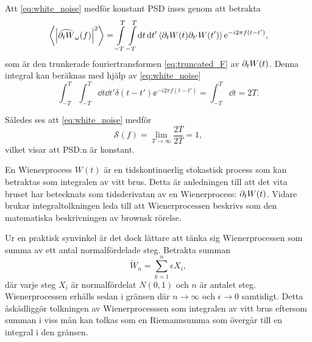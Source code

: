 Att \eqref{eq:white_noise} medför konstant PSD inses genom att betrakta
\begin{equation}
    \ev{\abs{\widehat{\pd_tW}_\omega(f)}^2} =
    \int_{-T}^{T}\int_{-T}^{T}\!\dd{t}\dd{t'}
    \ev{\pd_tW(t)\pd_{t'}W(t')}\ee^{-i2\pi f(t-t')},
\end{equation}
som är den trunkerade fouriertransformen \eqref{eq:truncated_F} av $\partial_tW(t)$. Denna integral kan beräknas med hjälp av \eqref{eq:white_noise}
\begin{equation}
    \int_{-T}^{T}\int_{-T}^{T}\!\dd{t}\dd{t'} 
     \delta(t-t')\ee^{-i2\pi f(t-t')} 
    =  \int_{-T}^{T}\dd{t} =2T.
\end{equation}

Således ses att \eqref{eq:white_noise} medför 
\begin{equation} \label{eq:white-noise_PSD}
    \mathcal{S}(f) = \lim_{T\to\infty}\dfrac{2T}{2T} = 1,
\end{equation}
vilket visar att PSD:n är konstant. 



En Wienerprocess $W(t)$ är en tidskontinuerlig stokastisk process som kan betraktas som integralen av vitt brus\cite{Miller_probability2012}. Detta är anledningen till att det vita bruset har betecknats som tidsderivatan av en Wienerprocess: $\partial_tW(t)$. Vidare brukar integraltolkningen leda till att Wienerprocessen beskrivs som den matematiska beskrivningen av brownsk rörelse. 

Ur en praktisk synvinkel är det dock lättare att tänka sig Wienerprocessen som summa av ett antal normalfördelade steg. Betrakta summan
\begin{equation}\label{eq:wiener_approx}
\tilde{W}_n = \sum_{k=1}^{n} \epsilon X_i,
\end{equation}
där varje steg $X_i$ är normalfördelat $N(0,1)$ och $n$ är antalet steg. 
Wienerprocessen erhålls sedan i gränsen där $n\to\infty$ och $\epsilon\to 0$ samtidigt\cite{Miller_probability2012}. Detta åskådliggör tolkningen av Wienerprocesssen som integralen av vitt brus eftersom summan i viss mån kan tolkas som en Riemannsumma som övergår till en integral i den gränsen.

